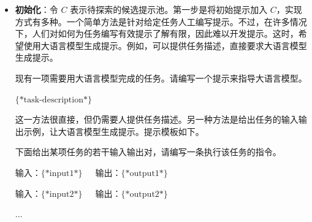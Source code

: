 \begin{itemize}
\item \vspace{0.5em} \textbf{初始化}：令 $C$ 表示待探索的候选提示池。第一步是将初始提示加入 $C$，实现方式有多种。一个简单方法是针对给定任务人工编写提示。不过，在许多情况下，人们对如何为任务编写有效提示了解有限，因此难以开发提示。这时，希望使用大语言模型生成提示。例如，可以提供任务描述，直接要求大语言模型生成提示。

\vspace{0.5em}
\begin{tcolorbox}

\begingroup
\setlength{\leftskip}{2em}
\setlength{\rightskip}{2em}

现有一项需要用大语言模型完成的任务。请编写一个提示来指导大语言模型。

\vspace{0.5em}

$\{*\mathrm{task\textrm{-}description}*\}$

\vspace{0.5em}

\underline{\hspace{2em}}

\endgroup

\end{tcolorbox}
\vspace{0.5em}

    这一方法很直接，但仍需要人提供任务描述。另一种方法是给出任务的输入输出示例，让大语言模型生成提示。提示模板如下。

\vspace{0.5em}
\begin{tcolorbox}

\begingroup
\setlength{\leftskip}{2em}
\setlength{\rightskip}{2em}

下面给出某项任务的若干输入输出对，请编写一条执行该任务的指令。

\vspace{0.5em}

输入：$\{*\mathrm{input}1*\}$\ \ \ 输出：$\{*\mathrm{output}1*\}$

\vspace{0.2em}

输入：$\{*\mathrm{input}2*\}$\ \ \ 输出：$\{*\mathrm{output}2*\}$

...

\vspace{0.5em}

\underline{\hspace{2em}}


\end{tcolorbox}
\end{itemize}
